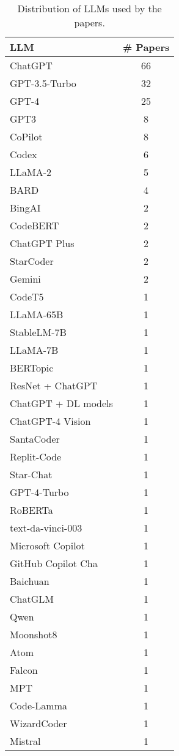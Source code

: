 \begin{table}[ht]
    \footnotesize
    \centering
    \caption{Distribution of LLMs used by the papers.}
    \begin{tabular}{@{}l c@{}}
        \toprule
        \textbf{LLM} & \textbf{\# Papers} \\
        \midrule
		ChatGPT & 66 \\
		GPT-3.5-Turbo & 32 \\
		GPT-4 & 25 \\
		GPT3 & 8 \\
		CoPilot & 8 \\
		Codex & 6 \\
		LLaMA-2 & 5 \\
		BARD & 4 \\
		BingAI & 2 \\
		CodeBERT & 2 \\
		ChatGPT Plus & 2 \\
		StarCoder & 2 \\
		Gemini & 2 \\
		CodeT5 & 1 \\
		LLaMA-65B & 1 \\
		StableLM-7B & 1 \\
		LLaMA-7B & 1 \\
		BERTopic & 1 \\
		ResNet + ChatGPT & 1 \\
		ChatGPT + DL models & 1 \\
		ChatGPT-4 Vision & 1 \\
		SantaCoder & 1 \\
		Replit-Code & 1 \\
		Star-Chat & 1 \\
		GPT-4-Turbo & 1 \\
		RoBERTa & 1 \\
		text-da-vinci-003 & 1 \\
		Microsoft Copilot & 1 \\
		GitHub Copilot Cha & 1 \\
		Baichuan & 1 \\
		ChatGLM & 1 \\
		Qwen & 1 \\
		Moonshot8 & 1 \\
		Atom & 1 \\
		Falcon & 1 \\
		MPT & 1 \\
		Code-Lamma & 1 \\
		WizardCoder & 1 \\
		Mistral & 1 \\
	\bottomrule
    \end{tabular}
    \label{tab:llms}
\end{table}